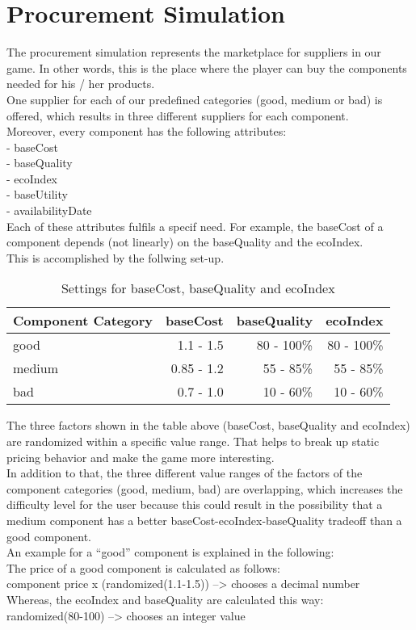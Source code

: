 \documentclass[11pt,titlepage,oneside,openany]{book}
\begin{document}



\section{Procurement Simulation}
The procurement simulation represents the marketplace for suppliers in our game. In other words, this is the place where the player can buy the components needed for his / her products.\\
One supplier for each of our predefined categories (good, medium or bad) is offered, which results in three different suppliers for each component. \\
Moreover, every component has the following attributes: \\
- baseCost\\
- baseQuality\\
- ecoIndex\\
- baseUtility\\
- availabilityDate\\

Each of these attributes fulfils a specif need. 
For example, the baseCost of a component depends (not linearly) on the baseQuality and the ecoIndex.\\
This is accomplished by the follwing set-up.

    \begin{table}[ht]
    \centering
    \begin{tabular}{|l|r|r|r|}
    \hline
    Component Category & baseCost & baseQuality & ecoIndex \\
    \hline
    good & 1.1 - 1.5 & 80 - 100\% & 80 - 100\% \\
    medium & 0.85 - 1.2 & 55 - 85\% & 55 - 85\%\\
    bad  & 0.7 - 1.0 & 10 - 60\% & 10 - 60\%\\
    \hline
    \end{tabular}
    \caption{Settings for baseCost, baseQuality and ecoIndex}
    \label{component_price_calculation}
    \end{table}

The three factors shown in the table above (baseCost, baseQuality and ecoIndex) are randomized within a specific value range. That helps to break up static pricing behavior and make the game more interesting.\\
In addition to that, the three different value ranges of the factors of the component categories (good, medium, bad) are overlapping, which increases the difficulty level for the user because this could result in the possibility that a medium component has a better baseCost-ecoIndex-baseQuality tradeoff than a good component.\\
An example for a “good” component is explained in the following:\\
The price of a good component is calculated as follows:\\
component price x (randomized(1.1-1.5)) --> chooses a decimal number\\
Whereas, the ecoIndex and baseQuality are calculated this way:\\
randomized(80-100) --> chooses an integer value\\
\end{document}
